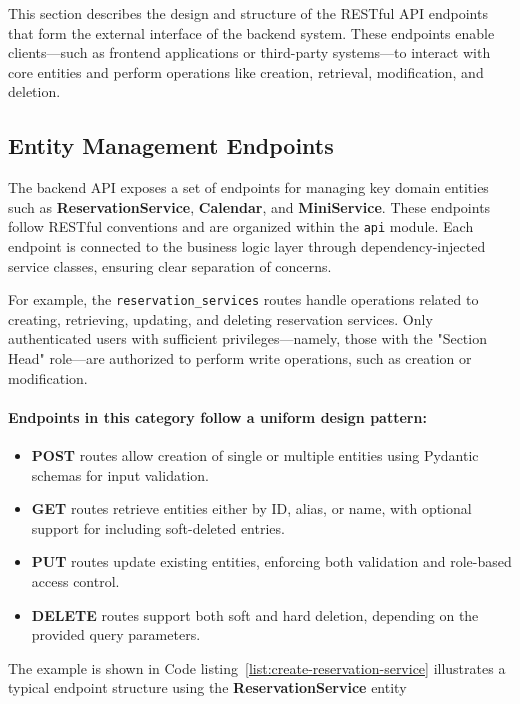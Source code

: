 This section describes the design and structure of the RESTful API endpoints that form the external interface of the backend system. These endpoints enable clients—such as frontend applications or third-party systems—to interact with core entities and perform operations like creation, retrieval, modification, and deletion. 

\subsection{Entity Management Endpoints}

The backend API exposes a set of endpoints for managing key domain entities such as \textbf{ReservationService}, \textbf{Calendar}, and \textbf{MiniService}. These endpoints follow RESTful conventions and are organized within the \texttt{api} module. Each endpoint is connected to the business logic layer through dependency-injected~\cite{DependencyInjection} service classes, ensuring clear separation of concerns.

For example, the \texttt{reservation\_services} routes handle operations related to creating, retrieving, updating, and deleting reservation services. Only authenticated users with sufficient privileges—namely, those with the "Section Head" role—are authorized to perform write operations, such as creation or modification.

\paragraph{Endpoints in this category follow a uniform design pattern:}
\begin{itemize}
  \item \textbf{POST} routes allow creation of single or multiple entities using Pydantic schemas for input validation.
  \item \textbf{GET} routes retrieve entities either by ID, alias, or name, with optional support for including soft-deleted entries.
  \item \textbf{PUT} routes update existing entities, enforcing both validation and role-based access control.
  \item \textbf{DELETE} routes support both soft and hard deletion, depending on the provided query parameters.
\end{itemize}

The example is shown in Code listing~\ref{list:create-reservation-service} illustrates a typical endpoint structure using the \textbf{ReservationService} entity

